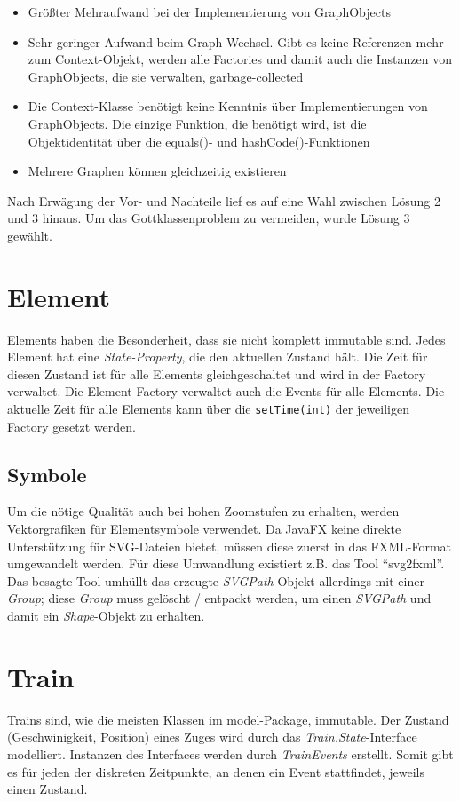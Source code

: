 \documentclass[accentcolor=tud0b,12pt,paper=a4]{tudreport}
\begin{document}
\begin{enumerate}
				\begin{itemize}
					\item Größter Mehraufwand bei der Implementierung von GraphObjects
					\item Sehr geringer Aufwand beim Graph-Wechsel. Gibt es keine Referenzen mehr zum Context-Objekt, werden alle Factories und damit auch die Instanzen von GraphObjects, die sie verwalten, garbage-collected
					\item Die Context-Klasse benötigt keine Kenntnis über Implementierungen von GraphObjects. Die einzige Funktion, die benötigt wird, ist die Objektidentität über die equals()- und hashCode()-Funktionen
					\item Mehrere Graphen können gleichzeitig existieren
				\end{itemize}
			\end{enumerate}
			
			Nach Erwägung der Vor- und Nachteile lief es auf eine Wahl zwischen Lösung 2 und 3 hinaus. Um das Gottklassenproblem zu vermeiden, wurde Lösung 3 gewählt.
				
	\section{Element}
		Elements haben die Besonderheit, dass sie nicht komplett immutable sind. Jedes Element hat eine \textit{State-Property}, die den aktuellen Zustand hält. Die Zeit für diesen Zustand ist für alle Elements gleichgeschaltet und wird in der Factory verwaltet. Die Element-Factory verwaltet auch die Events für alle Elements. Die aktuelle Zeit für alle Elements kann über die \texttt{setTime(int)} der jeweiligen Factory gesetzt werden.\\
		
		\subsection{Symbole}
			Um die nötige Qualität auch bei hohen Zoomstufen zu erhalten, werden Vektorgrafiken für Elementsymbole verwendet. Da JavaFX keine direkte Unterstützung für SVG-Dateien bietet, müssen diese zuerst in das FXML-Format umgewandelt werden. Für diese Umwandlung existiert z.B. das Tool "`svg2fxml"'.
			Das besagte Tool umhüllt das erzeugte \textit{SVGPath}-Objekt allerdings mit einer \textit{Group}; diese \textit{Group} muss gelöscht / entpackt werden, um einen \textit{SVGPath} und damit ein \textit{Shape}-Objekt zu erhalten.
		
	\section{Train}
	\label{train}
		Trains sind, wie die meisten Klassen im model-Package, immutable. Der Zustand (Geschwinigkeit, Position) eines Zuges wird durch das \textit{Train.State}-Interface modelliert. Instanzen des Interfaces werden durch \textit{TrainEvents} erstellt. Somit gibt es für jeden der diskreten Zeitpunkte, an denen ein Event stattfindet, jeweils einen Zustand.
		
\end{document}
